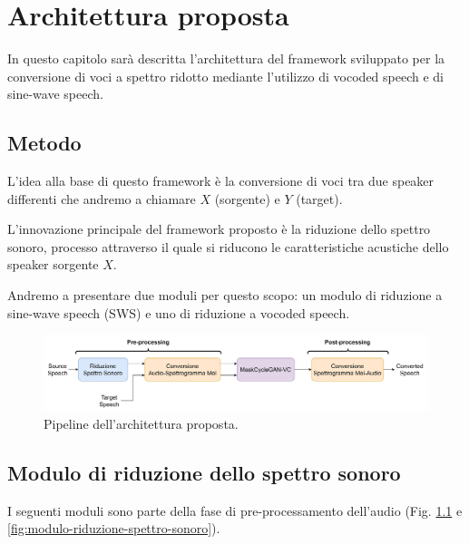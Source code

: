 \chapter{Architettura proposta}
	\label{chap:architettura-proposta}
		In questo capitolo sarà descritta l'architettura del framework sviluppato per la conversione di voci a spettro ridotto mediante l'utilizzo di vocoded speech e di sine-wave speech.
		
		\section{Metodo}
		L'idea alla base di questo framework è la conversione di voci tra due speaker differenti che andremo a chiamare $X$ (sorgente) e $Y$ (target).
		
		L'innovazione principale del framework proposto è la riduzione dello spettro sonoro, processo attraverso il quale si riducono le caratteristiche acustiche dello speaker sorgente $X$.
		
		Andremo a presentare due moduli per questo scopo: un modulo di riduzione a sine-wave speech (SWS) e uno di riduzione a vocoded speech.
	
		\begin{figure}[h]
			\centering
			\includegraphics[width=1\linewidth]{figures/MaskCycleGAN-SWS-VC-pipeline}
			\caption{Pipeline dell'architettura proposta.}
			\label{fig:maskcyclegan-sws-vc-pipeline}
		\end{figure}		
		
		\section{Modulo di riduzione dello spettro sonoro}
		\label{sec:proposta-riduzione}
			I seguenti moduli sono parte della fase di pre-processamento dell'audio (Fig. \ref{fig:maskcyclegan-sws-vc-pipeline} e \ref{fig:modulo-riduzione-spettro-sonoro}).			
		
